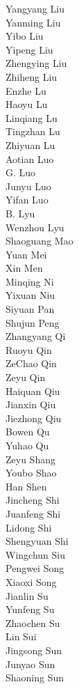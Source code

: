 Yangyang Liu\\
Yanming Liu\\
Yibo Liu\\
Yipeng Liu\\
Zhengying Liu\\
Zhiheng Liu\\
Enzhe Lu\\
Haoyu Lu\\
Linqiang Lu\\
Tingzhan Lu\\
Zhiyuan Lu\\
Aotian Luo\\
G. Luo\\
Junyu Luo\\
Yifan Luo\\
B. Lyu\\
Wenzhou Lyu\\
Shaoguang Mao\\
Yuan Mei\\
Xin Men\\
Minqing Ni\\
Yixuan Niu\\
Siyuan Pan\\
Shujun Peng\\
Zhangyang Qi\\
Ruoyu Qin\\
ZeChao Qin\\
Zeyu Qin\\
Haiquan Qiu\\
Jianxin Qiu\\
Jiezhong Qiu\\
Bowen Qu\\
Yuhao Qu\\
Zeyu Shang\\
Youbo Shao\\
Han Shen\\
Jincheng Shi\\
Juanfeng Shi\\
Lidong Shi\\
Shengyuan Shi\\
Wingchun Siu\\
Pengwei Song\\
Xiaoxi Song\\
Jianlin Su\\
Yunfeng Su\\
Zhaochen Su\\
Lin Sui\\
Jingsong Sun\\
Junyao Sun\\
Shaoning Sun\\
